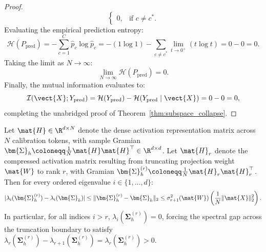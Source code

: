 \begin{proof}
\begin{equation}
\begin{cases}
0, & \text{if } c \ne c^*.
\end{cases}
\end{equation}
Evaluating the empirical prediction entropy:
\begin{equation}
\mathcal{H}(P_{\text{pred}}) = -\sum_{c=1}^C \hat{p}_c \log \hat{p}_c = -(1 \log 1) - \sum_{c \ne c^*} \lim_{t \to 0^+} (t \log t) = 0 - 0 = 0.
\end{equation}
Taking the limit as $N \to \infty$:
\begin{equation}
\lim_{N \to \infty} \mathcal{H}(P_{\text{pred}}) = 0.
\end{equation}
Finally, the mutual information evaluates to:
\begin{equation}
\mathcal{I}(\vect{X}; Y_{\text{pred}}) = \mathcal{H}(Y_{\text{pred}}) - \mathcal{H}(Y_{\text{pred}} \mid \vect{X}) = 0 - 0 = 0,
\end{equation}
completing the unabridged proof of Theorem~\ref{thm:subspace_collapse}.
\end{proof}

\begin{lemma}
\label{lem:weyl_gramian_perturbation}
Let $\mat{H} \in \R^{d \times N}$ denote the dense activation representation matrix across $N$ calibration tokens, with sample Gramian $\bm{\Sigma}_h \coloneqq \frac{1}{N} \mat{H} \mat{H}^\top \in \R^{d \times d}$.
Let $\mat{H}_r$ denote the compressed activation matrix resulting from truncating projection weight $\mat{W}$ to rank $r$, with Gramian $\bm{\Sigma}_h^{(r)} \coloneqq \frac{1}{N} \mat{H}_r \mat{H}_r^\top$.
Then for every ordered eigenvalue $i \in \{1, \dots, d\}$:
\begin{equation}
|\lambda_i(\bm{\Sigma}_h^{(r)}) - \lambda_i(\bm{\Sigma}_h)| \le \|\bm{\Sigma}_h^{(r)} - \bm{\Sigma}_h\|_2 \le \sigma_{r+1}^2(\mat{W}) \left( \frac{1}{N} \|\mat{X}\|_2^2 \right).
\label{eq:weyl_gramian_bound}
\end{equation}
In particular, for all indices $i > r$, $\lambda_i(\bm{\Sigma}_h^{(r)}) = 0$, forcing the spectral gap across the truncation boundary to satisfy $\lambda_r(\bm{\Sigma}_h^{(r)}) - \lambda_{r+1}(\bm{\Sigma}_h^{(r)}) = \lambda_r(\bm{\Sigma}_h^{(r)}) > 0$.
\end{lemma}

